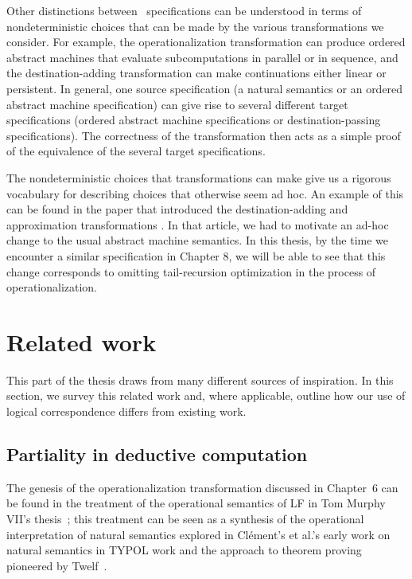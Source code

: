 Other distinctions between \sls~specifications can be understood in
terms of nondeterministic choices that can be made by the various
transformations we consider. For example, the operationalization
transformation can produce ordered abstract machines that evaluate
subcomputations in parallel or in sequence, and the destination-adding
transformation can make continuations either linear or persistent. In
general, one source specification (a natural semantics or an ordered
abstract machine specification) can give rise to several different
target specifications (ordered abstract machine specifications or
destination-passing specifications). The correctness of the
transformation then acts as a simple proof of the equivalence of the
several target specifications.

The nondeterministic choices that transformations can make give us a
rigorous vocabulary for describing choices that otherwise seem
ad hoc. An example of this can be found in the paper that introduced
the destination-adding and approximation transformations
\cite{simmons11logical}. In that article, we had to motivate an ad-hoc
change to the usual abstract machine semantics. In this thesis, by the
time we encounter a similar specification in Chapter 8, we will be
able to see that this change corresponds to omitting tail-recursion
optimization in the process of operationalization.

\section{Related work}

This part of the thesis draws from many different sources of
inspiration. In this section, we survey this related work and, where
applicable, outline how our use of logical correspondence differs from
existing work.

\subsection*{Partiality in deductive computation}

The genesis of the operationalization transformation discussed in
Chapter~6 can be found in the treatment of the operational semantics
of LF in Tom Murphy VII's thesis~\cite{murphy08modal}; this treatment
can be seen as a synthesis of the operational interpretation of
natural semantics explored in Cl\'ement's et al.'s early work on
natural semantics in TYPOL work and the approach to theorem proving
pioneered by Twelf~\cite{pfenning99system}.

